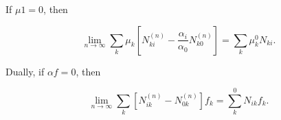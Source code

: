 If $\mu 1 = 0$, then

$$\lim_{n \to \infty} \sum_k \mu_k \left[ N_{ki}^{(n)} - \frac{\alpha_i}{\alpha_0} N_{k0}^{(n)} \right] = \sum_k \mu_k^0 N_{ki}.$$

Dually, if $\alpha f = 0$, then

$$\lim_{n \to \infty} \sum_k \left[ N_{ik}^{(n)} - N_{0k}^{(n)} \right] f_k = \sum_k^0 N_{ik} f_k.$$
